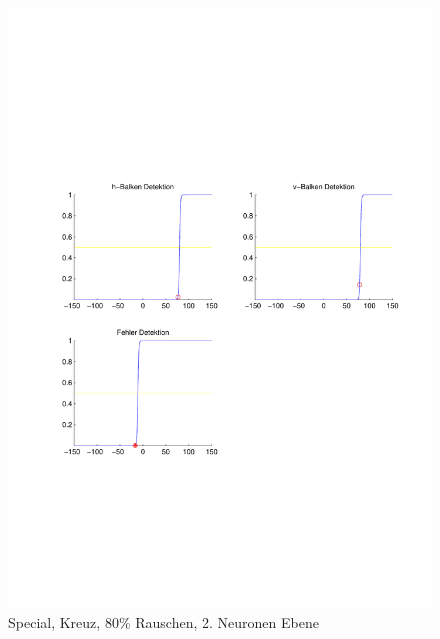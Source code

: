 \begin{figure}[hbt]
\begin{minipage}{0.8 \textwidth}
		\includegraphics[width=\textwidth]{./Bilder/Auswertung/Endergebnis/TypeSpecial_Rauschen80_Cross_Layer2}
		\caption{Special, Kreuz, 80\% Rauschen, 2. Neuronen Ebene}
		\label{Special_Kreuz_80_2}
	\end{minipage}
\end{figure}
\clearpage

